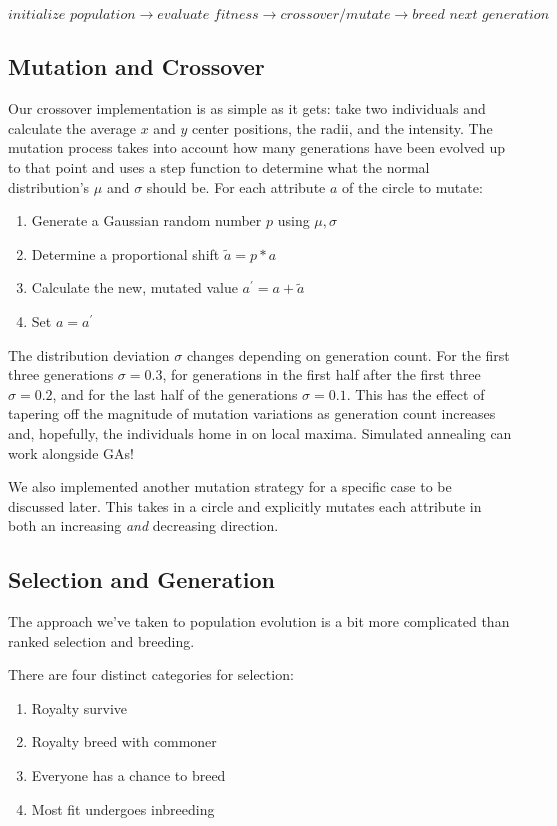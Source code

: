 \documentclass[12pt]{article}
\begin{document}
$$
\textit{initialize population}
\rightarrow\textit{evaluate fitness}
\rightarrow\textit{crossover/mutate}
\rightarrow\textit{breed next generation}
$$

\subsection*{Mutation and Crossover}
Our crossover implementation is as simple as it gets: take two individuals and calculate the average $x$ and $y$ center positions, the radii, and the intensity. The mutation process takes into account how many generations have been evolved up to that point and uses a step function to determine what the normal distribution's $\mu$ and $\sigma$ should be. For each attribute $a$ of the circle to mutate:

\begin{enumerate}
\item Generate a Gaussian random number $p$ using $\mu, \sigma$
\item Determine a proportional shift $\tilde{a} = p*a$
\item Calculate the new, mutated value $a^{\prime} = a + \tilde{a}$
\item Set $a = a^{\prime}$ 
\end{enumerate}
The distribution deviation $\sigma$ changes depending on generation count. For the first three generations $\sigma = 0.3$, for generations in the first half after the first three $\sigma = 0.2$, and for the last half of the generations $\sigma = 0.1$. This has the effect of tapering off the magnitude of mutation variations as generation count increases and, hopefully, the individuals home in on local maxima. Simulated annealing can work alongside GAs!

We also implemented another mutation strategy for a specific case to be discussed later. This takes in a circle and explicitly mutates each attribute in both an increasing \textit{and} decreasing direction.


\subsection*{Selection and Generation}
The approach we've taken to population evolution is a bit more complicated than ranked selection and breeding. 

There are four distinct categories for selection:
\begin{enumerate}
    \item Royalty survive
    \item Royalty breed with commoner
    \item Everyone has a chance to breed
    \item Most fit undergoes inbreeding
\end{enumerate}
\end{document}
